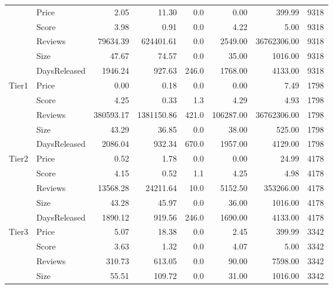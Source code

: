 \begin{longtable}[h!]{llrrrrrr}
\bottomrule
\endlastfoot
\multirow{5}{*}{Full} & Price &       2.05 &       11.30 &    0.0 &       0.00 &       399.99 &   9318 \\
        & Score &       3.98 &        0.91 &    0.0 &       4.22 &         5.00 &   9318 \\
        & Reviews &   79634.39 &   624401.61 &    0.0 &    2549.00 &  36762306.00 &   9318 \\
        & Size &      47.67 &       74.57 &    0.0 &      35.00 &      1016.00 &   9318 \\
        & DaysReleased &    1946.24 &      927.63 &  246.0 &    1768.00 &      4133.00 &   9318 \\
\cline{1-8}
\multirow{5}{*}{Tier1} & Price &       0.00 &        0.18 &    0.0 &       0.00 &         7.49 &   1798 \\
        & Score &       4.25 &        0.33 &    1.3 &       4.29 &         4.93 &   1798 \\
        & Reviews &  380593.17 &  1381150.86 &  421.0 &  106287.00 &  36762306.00 &   1798 \\
        & Size &      43.29 &       36.85 &    0.0 &      38.00 &       525.00 &   1798 \\
        & DaysReleased &    2086.04 &      932.34 &  670.0 &    1957.00 &      4129.00 &   1798 \\
\cline{1-8}
\multirow{5}{*}{Tier2} & Price &       0.52 &        1.78 &    0.0 &       0.00 &        24.99 &   4178 \\
        & Score &       4.15 &        0.52 &    1.1 &       4.25 &         4.98 &   4178 \\
        & Reviews &   13568.28 &    24211.64 &   10.0 &    5152.50 &    353266.00 &   4178 \\
        & Size &      43.28 &       45.97 &    0.0 &      36.00 &      1016.00 &   4178 \\
        & DaysReleased &    1890.12 &      919.56 &  246.0 &    1690.00 &      4133.00 &   4178 \\
\cline{1-8}
\multirow{5}{*}{Tier3} & Price &       5.07 &       18.38 &    0.0 &       2.45 &       399.99 &   3342 \\
        & Score &       3.63 &        1.32 &    0.0 &       4.07 &         5.00 &   3342 \\
        & Reviews &     310.73 &      613.05 &    0.0 &      90.00 &      7598.00 &   3342 \\
        & Size &      55.51 &      109.72 &    0.0 &      31.00 &      1016.00 &   3342 \\

\end{longtable}
